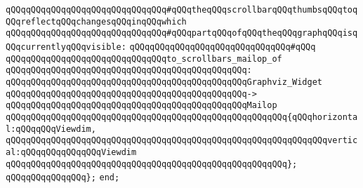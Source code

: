 \verb|qQQqqQQqqQQqqQQqqQQqqQQqqQQqqQQq#qQQqtheqQQqscrollbarqQQqthumbsqQQqtoqQQqreflectqQQqchangesqQQqinqQQqwhich|\newline
\verb|qQQqqQQqqQQqqQQqqQQqqQQqqQQqqQQq#qQQqpartqQQqofqQQqtheqQQqgraphqQQqisqQQqcurrentlyqQQqvisible:|\newline
\verb|qQQqqQQqqQQqqQQqqQQqqQQqqQQqqQQq#qQQq|\newline
\verb|qQQqqQQqqQQqqQQqqQQqqQQqqQQqqQQqto_scrollbars_mailop_of|\newline
\verb|qQQqqQQqqQQqqQQqqQQqqQQqqQQqqQQqqQQqqQQqqQQqqQQq:|\newline
\verb|qQQqqQQqqQQqqQQqqQQqqQQqqQQqqQQqqQQqqQQqqQQqqQQqGraphviz_Widget|\newline
\verb|qQQqqQQqqQQqqQQqqQQqqQQqqQQqqQQqqQQqqQQqqQQqqQQq->|\newline
\verb|qQQqqQQqqQQqqQQqqQQqqQQqqQQqqQQqqQQqqQQqqQQqqQQqMailop|\newline
\verb|qQQqqQQqqQQqqQQqqQQqqQQqqQQqqQQqqQQqqQQqqQQqqQQqqQQqqQQq{qQQqhorizontal:qQQqqQQqViewdim,|\newline
\verb|qQQqqQQqqQQqqQQqqQQqqQQqqQQqqQQqqQQqqQQqqQQqqQQqqQQqqQQqqQQqqQQqvertical:qQQqqQQqqQQqqQQqViewdim|\newline
\verb|qQQqqQQqqQQqqQQqqQQqqQQqqQQqqQQqqQQqqQQqqQQqqQQqqQQqqQQq};|\newline
\verb|qQQqqQQqqQQqqQQq};|\newline
\newline
\verb|end;|\newline

